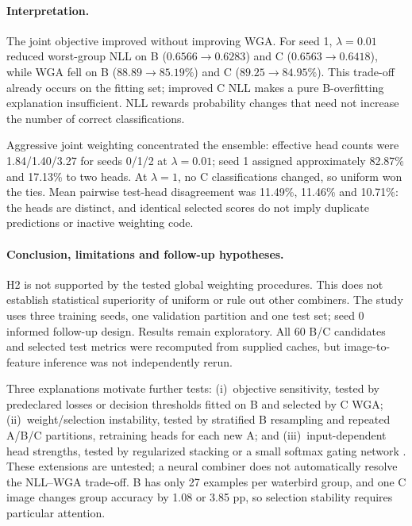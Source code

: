 \documentclass[runningheads]{llncs}
\begin{document}
\paragraph{Interpretation.}
The joint objective improved without improving WGA. For seed 1, $\lambda=0.01$ reduced worst-group NLL on B ($0.6566\rightarrow0.6283$) and C ($0.6563\rightarrow0.6418$), while WGA fell on B ($88.89\rightarrow85.19\%$) and C ($89.25\rightarrow84.95\%$). This trade-off already occurs on the fitting set; improved C NLL makes a pure B-overfitting explanation insufficient. NLL rewards probability changes that need not increase the number of correct classifications.

Aggressive joint weighting concentrated the ensemble: effective head counts were 1.84/1.40/3.27 for seeds 0/1/2 at $\lambda=0.01$; seed 1 assigned approximately 82.87\% and 17.13\% to two heads. At $\lambda=1$, no C classifications changed, so uniform won the ties. Mean pairwise test-head disagreement was 11.49\%, 11.46\% and 10.71\%: the heads are distinct, and identical selected scores do not imply duplicate predictions or inactive weighting code.

\paragraph{Conclusion, limitations and follow-up hypotheses.}
H2 is not supported by the tested global weighting procedures. This does not establish statistical superiority of uniform or rule out other combiners. The study uses three training seeds, one validation partition and one test set; seed 0 informed follow-up design. Results remain exploratory. All 60 B/C candidates and selected test metrics were recomputed from supplied caches, but image-to-feature inference was not independently rerun.

Three explanations motivate further tests: (i)~objective sensitivity, tested by predeclared losses or decision thresholds fitted on B and selected by C WGA; (ii)~weight/selection instability, tested by stratified B resampling and repeated A/B/C partitions, retraining heads for each new A; and (iii)~input-dependent head strengths, tested by regularized stacking \cite{stacking} or a small softmax gating network \cite{mixtures}. These extensions are untested; a neural combiner does not automatically resolve the NLL--WGA trade-off. B has only 27 examples per waterbird group, and one C image changes group accuracy by 1.08 or 3.85 pp, so selection stability requires particular attention.
\end{document}

